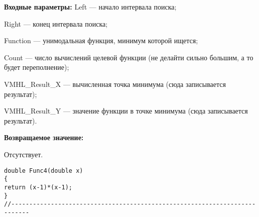 \textbf{Входные параметры:}
 Left --- начало интервала поиска;
 
Right --- конец интервала поиска;
 
Function --- унимодальная функция, минимум которой ищется;
 
Count --- число вычислений целевой функции (не делайти сильно большим, а то будет переполнение);
 
VMHL\_Result\_X --- вычисленная точка минимума (сюда записывается результат);
 
VMHL\_Result\_Y --- значение функции в точке минимума (сюда записывается результат).

\textbf{Возвращаемое значение:}
 
 Отсутствует.

\begin{lstlisting}[caption=Оптимизируемая функция]
double Func4(double x)
{
return (x-1)*(x-1);
}
//---------------------------------------------------------------------------
\end{lstlisting}
